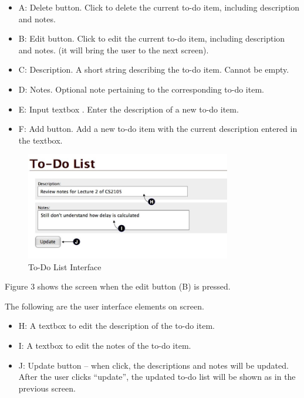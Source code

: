 \documentclass[a4paper,11pt]{exam}
\begin{document}
\begin{itemize}
	\item A: Delete button. Click to delete the current to-do item, including description and notes.
	\item B: Edit button. Click to edit the current to-do item, including description and notes. (it will bring the user to the next screen).
	\item C: Description. A short string describing the to-do item. Cannot be empty.
	\item D: Notes. Optional note pertaining to the corresponding to-do item.
	\item E: Input textbox . Enter the description of a new to-do item.
	\item F: Add button. Add a new to-do item with the current description entered in the textbox.
\end{itemize}

\begin{figure}
\begin{center}
	\includegraphics[width=0.8\textwidth]{todo-edit.jpg}
\end{center}
\caption{To-Do List Interface}
\end{figure}

Figure 3 shows the screen when the edit button (B) is pressed.


The following are the user interface elements on screen.

\begin{itemize}
	\item H: A textbox to edit the description of the to-do item.
	\item I: A textbox to edit the notes of the to-do item.
	\item J: Update button -- when click, the descriptions and notes will be updated. After the user clicks ``update'', the updated to-do list will be shown as in the previous screen.
\end{itemize}
\end{document}
